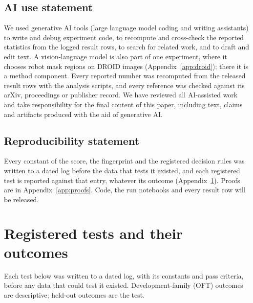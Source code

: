 \documentclass{article}
\begin{document}
\subsection*{AI use statement}

We used generative AI tools (large language model coding and writing assistants) to write and debug experiment code,
to recompute and cross-check the reported statistics from the logged result rows, to search for related work, and to
draft and edit text. A vision-language model is also part of one experiment, where it chooses robot mask regions on
DROID images (Appendix~\ref{app:droid}); there it is a method component. Every reported number was recomputed from the
released result rows with the analysis scripts, and every reference was checked against its arXiv, proceedings or
publisher record. We have reviewed all AI-assisted work and take responsibility for the final content of this paper,
including text, claims and artifacts produced with the aid of generative AI.

\subsection*{Reproducibility statement}

Every constant of the score, the fingerprint and the registered decision rules was written to a dated log before the
data that tests it existed, and each registered test is reported against that entry, whatever its outcome
(Appendix~\ref{app:prereg}). Proofs are in Appendix~\ref{app:proofs}. Code, the run notebooks and every result row will
be released.




\appendix

\section{Registered tests and their outcomes}
\label{app:prereg}
Each test below was written to a dated log, with its constants and pass criteria, before any data that could test it
existed. Development-family (OFT) outcomes are descriptive; held-out outcomes are the test.
\end{document}
